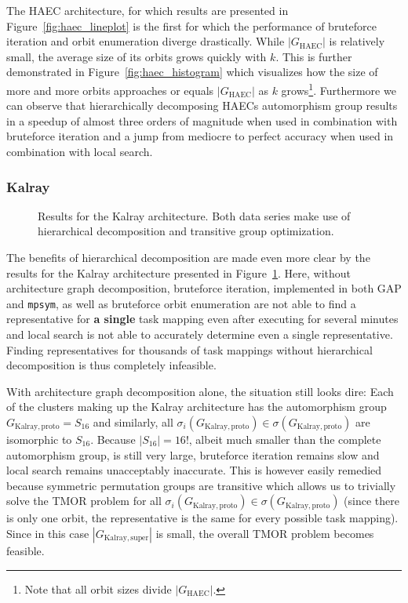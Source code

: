 The HAEC architecture, for which results are presented in
Figure~\ref{fig:haec_lineplot} is the first for which the performance of
bruteforce iteration and orbit enumeration diverge drastically. While
$|G_{\mathrm{HAEC}}|$ is relatively small, the average
size of its orbits grows quickly with $k$. This is further demonstrated in
Figure~\ref{fig:haec_histogram} which visualizes how the size of more and more
orbits approaches or equals $|G_{\mathrm{HAEC}}|$ as $k$ grows\footnote{Note that
all orbit sizes divide $|G_{\mathrm{HAEC}}|$.}. Furthermore we can observe that
hierarchically decomposing HAECs automorphism group results in a speedup of
almost three orders of magnitude when used in combination with bruteforce
iteration and a jump from mediocre to perfect accuracy when used in combination
with local search.

\subsubsection{Kalray}

\begin{figure}
  
  \caption{Results for the Kalray architecture. Both data series make use
           of hierarchical decomposition and transitive group optimization.}
  \label{fig:kalray_lineplot}
\end{figure}

The benefits of hierarchical decomposition are made even more clear by the
results for the Kalray architecture presented in
Figure~\ref{fig:kalray_lineplot}.  Here, without architecture graph
decomposition, bruteforce iteration, implemented in both GAP and
\texttt{mpsym}, as well as bruteforce orbit enumeration are not able to find a
representative for \textbf{a single} task mapping even after executing for
several minutes and local search is not able to accurately determine even a
single representative.  Finding representatives for thousands of task mappings
without hierarchical decomposition is thus completely infeasible.

With architecture graph decomposition alone, the situation still looks dire:
Each of the clusters making up the Kalray architecture has the automorphism
group $G_{\mathrm{Kalray,proto}} = S_{16}$ and similarly, all
$\sigma_i(G_{\mathrm{Kalray,proto}}) \in \sigma(G_{\mathrm{Kalray,proto}})$ are
isomorphic to $S_{16}$.  Because $|S_{16}| = 16!$, albeit much smaller than the
complete automorphism group, is still very large, bruteforce iteration remains
slow and local search remains unacceptably inaccurate. This is however easily
remedied because symmetric permutation groups are transitive which allows us to
trivially solve the TMOR problem for all $\sigma_i(G_{\mathrm{Kalray,proto}})
\in \sigma(G_{\mathrm{Kalray,proto}})$ (since there is only one orbit, the
representative is the same for every possible task mapping). Since in this case
$|G_{\mathrm{Kalray,super}}|$ is small, the overall TMOR problem becomes
feasible.

